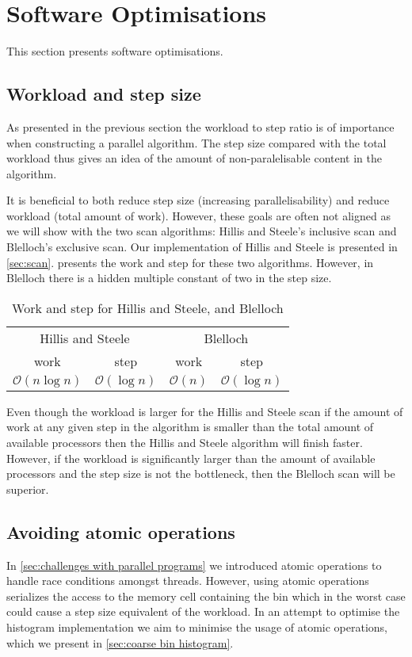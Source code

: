 \section{Software Optimisations}
\label{sec:software optimisations}

This section presents software optimisations.

\subsection{Workload and step size}
\label{sec:workload and step size}
As presented in the previous section the workload to step ratio is of importance when constructing a parallel algorithm.
The step size compared with the total workload thus gives an idea of the amount of non-paralelisable content in the algorithm.

It is beneficial to both reduce step size (increasing parallelisability) and reduce workload (total amount of work).
However, these goals are often not aligned as we will show with the two scan algorithms: Hillis and Steele's inclusive scan and Blelloch's exclusive scan.
Our implementation of Hillis and Steele is presented in \cref{sec:scan}.
 presents the work and step for these two algorithms.
However, in Blelloch there is a hidden multiple constant of two in the step size.

\begin{table}[htb]
  \centering
  \begin{tabular}{cccc}
    \toprule
    \multicolumn{2}{c}{Hillis and Steele} & \multicolumn{2}{c}{Blelloch} \\
    work & step & work & step \\
    \midrule
    $\mathcal{O}(n\log n)$ & $\mathcal{O}(\log n)$ & $\mathcal{O}(n)$ & $\mathcal{O}(\log n)$ \\
    \bottomrule
  \end{tabular}
  \caption{Work and step for Hillis and Steele, and Blelloch}
  \label{tab:hs b}
\end{table}

Even though the workload is larger for the Hillis and Steele scan if the amount of work at any given step in the algorithm is smaller than the total amount of available processors then the Hillis and Steele algorithm will finish faster.
However, if the workload is significantly larger than the amount of available processors and the step size is not the bottleneck, then the Blelloch scan will be superior.

\subsection{Avoiding atomic operations}
In \cref{sec:challenges with parallel programs} we introduced atomic operations to handle race conditions amongst threads.
However, using atomic operations serializes the access to the memory cell containing the bin which in the worst case could cause a step size equivalent of the workload.
In an attempt to optimise the histogram implementation we aim to minimise the usage of atomic operations, which we present in \cref{sec:coarse bin histogram}.
